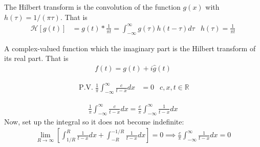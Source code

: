 \documentclass[12pt, english]{book}
\makeatletter
\renewenvironment{proof}[1][\proofname]{\par
	\pushQED{\qed}%
	\normalfont \topsep6\p@\@plus6\p@\relax
	\list{}{%
		\settowidth{\leftmargin}{\itshape\proofname:\hskip\labelsep}%
		\setlength{\labelwidth}{0pt}%
		\setlength{\itemindent}{-\leftmargin}%
	}%
	\item[\hskip\labelsep\itshape#1\@addpunct{:}]\ignorespaces
	}{ \popQED\endlist\@endpefalse}
\makeatother
\begin{document}
	\begin{observation}
		The Hilbert transform is the convolution of the function \(g(x)\) with \(h(\tau) = 1/(\pi \tau)\). That is 
		\begin{align*}
			\mathcal{H}[g(t)] &= g(t) \ast \frac{1}{\pi t}
				= \int_{-\infty}^{\infty} g(\tau) h(t - \tau) d\tau
				& h(\tau) = \frac{1}{\pi t}
		\end{align*}
	\end{observation}

	\begin{definition}
		\label{Analytic Signal Definition - Complex}
		A complex-valued function which the imaginary part is the Hilbert transform of its real part. That is
		\begin{align*}
			f(t)= g(t) + i\hat{g}(t)
		\end{align*}
	\end{definition}

	\begin{example}
		\label{Hilbert Transform of a Constant Example - Complex}
		\begin{align*}
			\operatorname{P.V.} \frac{1}{\pi} \int_{-\infty}^{\infty} \frac{c}{t-x} dx &= 0
			& c, x, t \in \mathbb{R}
		\end{align*}
		\begin{proof}
		{\color{Grey}
			\begin{align*}
				\frac{1}{\pi} \int_{-\infty}^{\infty} \frac{c}{t-x} dx 
				= \frac{c}{\pi} \int_{-\infty}^{\infty} \frac{1}{t-x} dx
			\end{align*}
			Now, set up the integral so it does not become indefinite: 
			\begin{align*}
				\lim_{R\rightarrow \infty} \left[
				\int_{1/R}^{R} \frac{1}{t-x} dx + \int_{-R}^{-1/R} \frac{1}{t-x} dx
				\right] = 0 
				\implies \frac{c}{\pi} \int_{-\infty}^{\infty} \frac{1}{t-x} dx = 0
			\end{align*}
		}
		\end{proof}
	\end{example}
\end{document}
